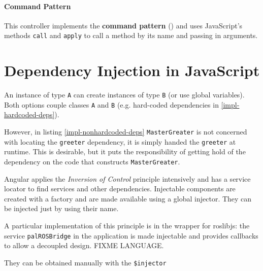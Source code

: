 \paragraph{Command Pattern} This controller implements the \textbf{command pattern} (\cite{Osmani:2012}) and uses JavaScript's methods \texttt{call} and \texttt{apply} to call a method by its name and passing in arguments.



\section{Dependency Injection in JavaScript}
An instance of type \texttt{A} can create instances of type \texttt{B} (or use global variables). 
Both options couple classes \texttt{A} and \texttt{B} (e.g. hard-coded dependencies in \ref{impl-hardcoded-deps}).





However, in listing \ref{impl-nonhardcoded-deps} \texttt{MasterGreater} is not concerned with locating the \texttt{greeter} dependency, it is simply handed the \texttt{greeter} at runtime.
This is desirable, but it puts the responsibility of getting hold of the dependency on the code that constructs \texttt{MasterGreater}.

Angular applies the \emph{Inversion of Control} principle intensively and has a service locator to find services and other dependencies.
Injectable components are created with a factory and are made available using a global injector.
They can be injected just by using their name.

A particular implementation of this principle is in the wrapper for roslibjs: the service \texttt{palROSBridge} in the application is made injectable and provides callbacks to allow a decoupled design. FIXME LANGUAGE.



They can be obtained manually with the \texttt{\$injector}


